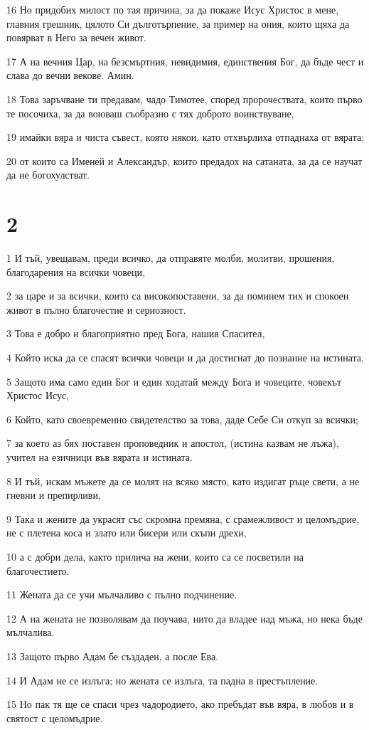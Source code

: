 \par 16 Но придобих милост по тая причина, за да покаже Исус Христос в мене, главния грешник, цялото Си дълготърпение, за пример на ония, които щяха да повярват в Него за вечен живот.
\par 17 А на вечния Цар, на безсмъртния, невидимия, единствения Бог, да бъде чест и слава до вечни векове. Амин.
\par 18 Това заръчване ти предавам, чадо Тимотее, според пророчествата, които първо те посочиха, за да воюваш съобразно с тях доброто воинствуване,
\par 19 имайки вяра и чиста съвест, която някои, като отхвърлиха отпаднаха от вярата;
\par 20 от които са Именей и Александър, които предадох на сатаната, за да се научат да не богохулстват.

\chapter{2}

\par 1 И тъй, увещавам, преди всичко, да отправяте молби, молитви, прошения, благодарения на всички човеци,
\par 2 за царе и за всички, които са високопоставени, за да поминем тих и спокоен живот в пълно благочестие и сериозност.
\par 3 Това е добро и благоприятно пред Бога, нашия Спасител,
\par 4 Който иска да се спасят всички човеци и да достигнат до познание на истината.
\par 5 Защото има само един Бог и един ходатай между Бога и човеците, човекът Христос Исус,
\par 6 Който, като своевременно свидетелство за това, даде Себе Си откуп за всички;
\par 7 за което аз бях поставен проповедник и апостол, (истина казвам не лъжа), учител на езичници във вярата и истината.
\par 8 И тъй, искам мъжете да се молят на всяко място, като издигат ръце свети, а не гневни и препирливи,
\par 9 Така и жените да украсят със скромна премяна, с срамежливост и целомъдрие, не с плетена коса и злато или бисери или скъпи дрехи,
\par 10 а с добри дела, както прилича на жени, които са се посветили на благочестието.
\par 11 Жената да се учи мълчаливо с пълно подчинение.
\par 12 А на жената не позволявам да поучава, нито да владее над мъжа, но нека бъде мълчалива.
\par 13 Защото първо Адам бе създаден, а после Ева.
\par 14 И Адам не се излъга; но жената се излъга, та падна в престъпление.
\par 15 Но пак тя ще се спаси чрез чадородието, ако пребъдат във вяра, в любов и в святост с целомъдрие.

